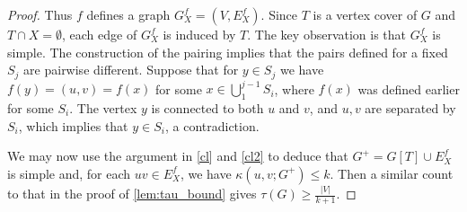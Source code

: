 \documentclass[10pt,a4paper]{amsart}
\begin{document}
\begin{proof}
Thus $f$ defines a graph $G_X^f=(V,E_X^f)$.
Since $T$ is a vertex cover of $G$ and $T\cap X=\emptyset$, each edge of $G_X^f$ is induced by $T$.
The key observation is that $G_X^f$ is simple.
The construction of
the pairing implies that the pairs defined for a fixed $S_j$ are
pairwise different. 
Suppose that for $y\in S_j$ we have $f(y)=(u,v)=f(x)$ for some
$x\in \bigcup_1^{j-1} S_i$, where $f(x)$ was defined earlier for some
$S_i$. The vertex $y$ is connected to both $u$ and $v$, and $u,v$ are separated by $S_i$,
which implies that $y\in S_i$, a contradiction. 

We may now use the argument in \cref{cl} and  \cref{cl2} to deduce that $G^+=G[T]\cup E_X^f$ is simple and,
for each $uv\in E_X^f$, we have $\kappa(u,v;G^+)\leq k$.
Then a similar count to that in the proof of \cref{lem:tau_bound} gives $\tau(G)\geq \frac{|V|}{k+1}$.
\end{proof}
\end{document}
